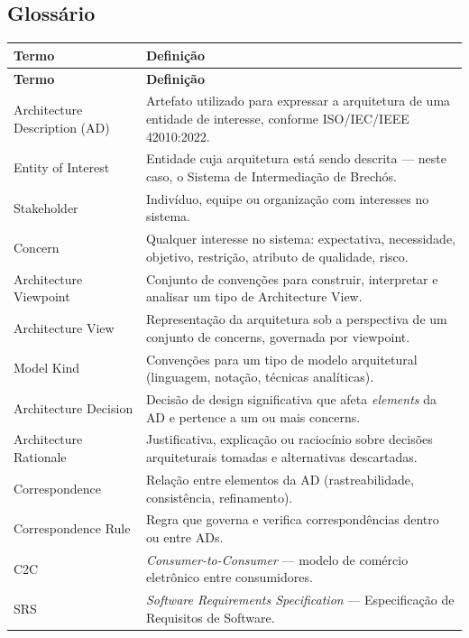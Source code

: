 ﻿\documentclass[12pt,a4paper]{article}
\begin{document}
\subsection{Glossário}

\begin{longtable}{|p{4.5cm}|p{10cm}|}
\hline
\textbf{Termo} & \textbf{Definição} \\
\hline
\endfirsthead
\hline
\textbf{Termo} & \textbf{Definição} \\
\hline
\endhead
Architecture Description (AD) & Artefato utilizado para expressar a arquitetura de uma entidade de interesse, conforme ISO/IEC/IEEE 42010:2022. \\
\hline
Entity of Interest & Entidade cuja arquitetura está sendo descrita --- neste caso, o Sistema de Intermediação de Brechós. \\
\hline
Stakeholder & Indivíduo, equipe ou organização com interesses no sistema. \\
\hline
Concern & Qualquer interesse no sistema: expectativa, necessidade, objetivo, restrição, atributo de qualidade, risco. \\
\hline
Architecture Viewpoint & Conjunto de convenções para construir, interpretar e analisar um tipo de Architecture View. \\
\hline
Architecture View & Representação da arquitetura sob a perspectiva de um conjunto de concerns, governada por viewpoint. \\
\hline
Model Kind & Convenções para um tipo de modelo arquitetural (linguagem, notação, técnicas analíticas). \\
\hline
Architecture Decision & Decisão de design significativa que afeta \textit{elements} da AD e pertence a um ou mais concerns. \\
\hline
Architecture Rationale & Justificativa, explicação ou raciocínio sobre decisões arquiteturais tomadas e alternativas descartadas. \\
\hline
Correspondence & Relação entre elementos da AD (rastreabilidade, consistência, refinamento). \\
\hline
Correspondence Rule & Regra que governa e verifica correspondências dentro ou entre ADs. \\
\hline
C2C & \textit{Consumer-to-Consumer} --- modelo de comércio eletrônico entre consumidores. \\
\hline
SRS & \textit{Software Requirements Specification} --- Especificação de Requisitos de Software. \\
\hline
\end{longtable}
\end{document}
